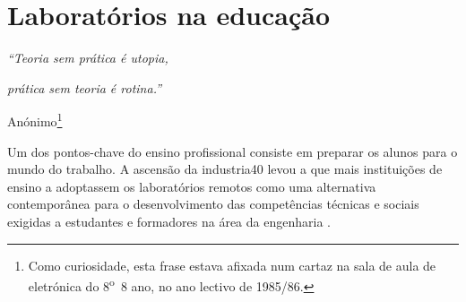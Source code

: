 
\section{Laboratórios na educação}
\label{Laboratóriosnaeducação}

\begin{center}
    \textit{``Teoria sem prática é utopia,}

    \textit{prática sem teoria é rotina.''}

    Anónimo\footnote{Como curiosidade, esta frase estava afixada num cartaz na sala de aula de eletrónica do 8\textsuperscript{o}~8 ano, no ano lectivo de 1985/86.}

\end{center}
Um dos pontos-chave do ensino profissional consiste em preparar os alunos para o mundo do trabalho. A ascensão da \gls{industria40} levou a que mais instituições de ensino a adoptassem os laboratórios remotos como uma alternativa contemporânea para o desenvolvimento das competências técnicas e sociais exigidas a estudantes e formadores na área da engenharia \cite{EvaluationRemoteVirtualE-Learning}.

